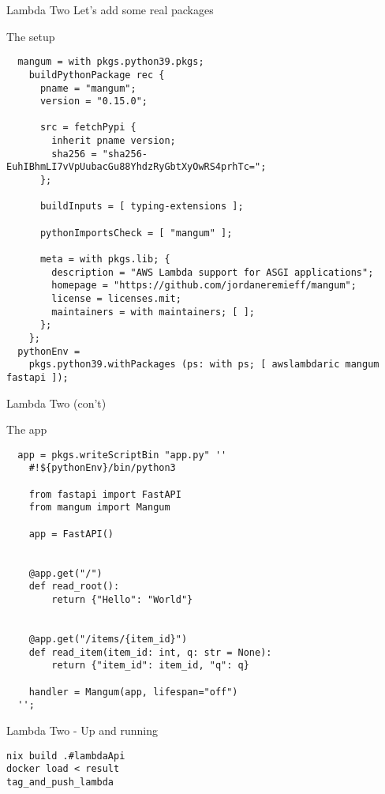 \documentclass[bigger]{beamer}
\begin{document}
\begin{frame}[label={sec:orga984a35},fragile]{Lambda Two}
 Let's add some real packages
\begin{block}{The setup}
\tiny
\begin{verbatim}
  mangum = with pkgs.python39.pkgs;
    buildPythonPackage rec {
      pname = "mangum";
      version = "0.15.0";

      src = fetchPypi {
        inherit pname version;
        sha256 = "sha256-EuhIBhmLI7vVpUubacGu88YhdzRyGbtXyOwRS4prhTc=";
      };

      buildInputs = [ typing-extensions ];

      pythonImportsCheck = [ "mangum" ];

      meta = with pkgs.lib; {
        description = "AWS Lambda support for ASGI applications";
        homepage = "https://github.com/jordaneremieff/mangum";
        license = licenses.mit;
        maintainers = with maintainers; [ ];
      };
    };
  pythonEnv =
    pkgs.python39.withPackages (ps: with ps; [ awslambdaric mangum fastapi ]);
\end{verbatim}
\end{block}
\end{frame}
\begin{frame}[label={sec:org0f8738a},fragile]{Lambda Two (con't)}
 \begin{block}{The app}
\tiny
\begin{verbatim}
  app = pkgs.writeScriptBin "app.py" ''
    #!${pythonEnv}/bin/python3

    from fastapi import FastAPI
    from mangum import Mangum

    app = FastAPI()


    @app.get("/")
    def read_root():
        return {"Hello": "World"}


    @app.get("/items/{item_id}")
    def read_item(item_id: int, q: str = None):
        return {"item_id": item_id, "q": q}

    handler = Mangum(app, lifespan="off")
  '';
\end{verbatim}
\end{block}
\end{frame}
\begin{frame}[label={sec:org1ba2dc7},fragile]{Lambda Two - Up and running}
 \tiny
\begin{verbatim}
nix build .#lambdaApi
docker load < result
tag_and_push_lambda
\end{verbatim}
\end{frame}
\end{document}
